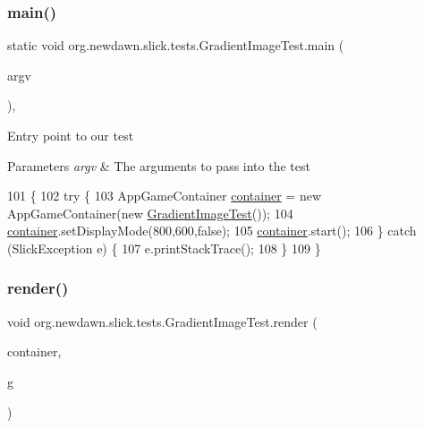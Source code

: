 \subsubsection{\texorpdfstring{main()}{main()}}
{\footnotesize\ttfamily static void org.\+newdawn.\+slick.\+tests.\+Gradient\+Image\+Test.\+main (\begin{DoxyParamCaption}\item[{String \mbox{[}$\,$\mbox{]}}]{argv }\end{DoxyParamCaption})\hspace{0.3cm}{\ttfamily [inline]}, {\ttfamily [static]}}

Entry point to our test


\begin{DoxyParams}{Parameters}
{\em argv} & The arguments to pass into the test \\
\hline
\end{DoxyParams}

\begin{DoxyCode}
101                                            \{
102         \textcolor{keywordflow}{try} \{
103             AppGameContainer \mbox{\hyperlink{classorg_1_1newdawn_1_1slick_1_1tests_1_1_gradient_image_test_a33951eefaea77bf372778299a807d06a}{container}} = \textcolor{keyword}{new} AppGameContainer(\textcolor{keyword}{new} 
      \mbox{\hyperlink{classorg_1_1newdawn_1_1slick_1_1tests_1_1_gradient_image_test_a325c7f08ba6dc2863679a6e155e5c23e}{GradientImageTest}}());
104             \mbox{\hyperlink{classorg_1_1newdawn_1_1slick_1_1tests_1_1_gradient_image_test_a33951eefaea77bf372778299a807d06a}{container}}.setDisplayMode(800,600,\textcolor{keyword}{false});
105             \mbox{\hyperlink{classorg_1_1newdawn_1_1slick_1_1tests_1_1_gradient_image_test_a33951eefaea77bf372778299a807d06a}{container}}.start();
106         \} \textcolor{keywordflow}{catch} (SlickException e) \{
107             e.printStackTrace();
108         \}
109     \}
\end{DoxyCode}
\mbox{\label{classorg_1_1newdawn_1_1slick_1_1tests_1_1_gradient_image_test_afa6acbf0a880f9f32a4e10c0b30912e2}} 
\subsubsection{\texorpdfstring{render()}{render()}}
{\footnotesize\ttfamily void org.\+newdawn.\+slick.\+tests.\+Gradient\+Image\+Test.\+render (\begin{DoxyParamCaption}\item[{\mbox{\hyperlink{classorg_1_1newdawn_1_1slick_1_1_game_container}{Game\+Container}}}]{container,  }\item[{\mbox{\hyperlink{classorg_1_1newdawn_1_1slick_1_1_graphics}{Graphics}}}]{g }\end{DoxyParamCaption})\hspace{0.3cm}{\ttfamily [inline]}}

